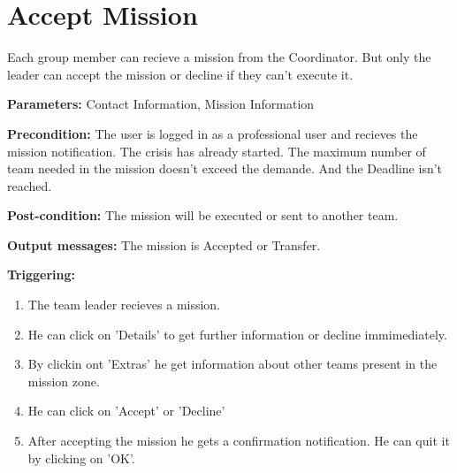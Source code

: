 \section{Accept Mission}
\label{operation:AcceptMission}
Each group member can recieve a mission from the Coordinator. But only the
leader can accept the mission or decline if they can't execute it.\\
\begin{description}
\item \textbf{Parameters:} Contact Information, Mission Information
\item \textbf{Precondition:} The user is logged in as a professional user
and recieves the mission notification. The crisis has already started. The
maximum number of team needed in the mission doesn't exceed the demande. And the
Deadline isn't reached.
\item \textbf{Post-condition:} The mission will be executed or sent to another
team.
\item \textbf{Output messages:} The mission is Accepted or Transfer.
\item \textbf{Triggering:}
\begin{enumerate}
\item The team leader recieves a mission.
\item He can click on 'Details' to get further information or decline
immimediately.
\item By clickin ont 'Extras' he get information about other teams present in
the mission zone.
\item He can click on 'Accept' or 'Decline'
\item After accepting the mission he gets a confirmation notification. He can
quit it by clicking on 'OK'.
\end{enumerate}
\end{description}  

